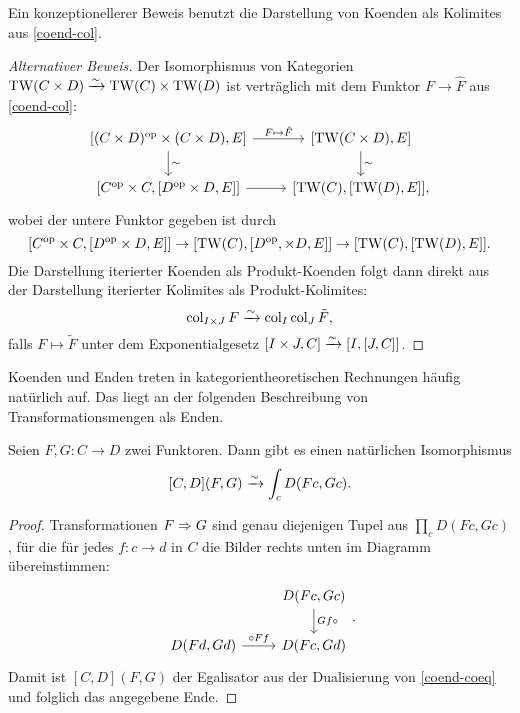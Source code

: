  Ein konzeptionellerer Beweis benutzt die Darstellung von Koenden als
 Kolimites aus \ref{coend-col}.
\begin{proof}[Alternativer Beweis]
  Der Isomorphismus von Kategorien $\operatorname{TW}(C \times D) \xrightarrow[]{\sim} \operatorname{TW}(C) \times
  \operatorname{TW}(D)$ ist verträglich mit dem Funktor $F \to \hat{F}$ aus
  \ref{coend-col}:
  \[ \begin{tikzcd}
    {[(C \times D)\op \times (C \times D), E]}
    \arrow{d}{\sim} \arrow{r}{F \mapsto \hat{F}}
    & {[\TW(C \times D), E]} \arrow{d}{\sim} \\
    {[C\op \times C, [D\op \times D, E]]} \arrow{r}
    & {[\TW(C), [\TW(D), E]]},
  \end{tikzcd}
  \]
  wobei der untere Funktor gegeben ist durch
  \[ [C^\mathrm{op} \times C, [D^\mathrm{op} \times D, E]]
  \to [\operatorname{TW}(C), [D^\mathrm{op}, \times D, E]] \to [\operatorname{TW}(C), [\operatorname{TW}(D), E]].
  \]
  Die Darstellung iterierter Koenden als Produkt-Koenden folgt dann
  direkt aus der Darstellung iterierter Kolimites als
  Produkt-Kolimites:
  \[ \operatorname{col}_{I \times J} F \xrightarrow[]{\sim} \operatorname{col}_I \operatorname{col}_J \tilde{F}, \]
  falls $F \mapsto \tilde{F}$ unter dem Exponentialgesetz $[I \times
    J, C] \xrightarrow[]{\sim} {[I, [J, C]]}$.
\end{proof}

Koenden und Enden treten in kategorientheoretischen Rechnungen häufig
natürlich auf. Das liegt an der folgenden Beschreibung von
Transformationsmengen als Enden.
\begin{lemma}
  \label{trans-end}
  Seien $F, G: C \to D$ zwei Funktoren. Dann gibt es einen natürlichen
  Isomorphismus
  \[ [C, D](F, G) \xrightarrow[]{\sim} \int_c D(Fc, Gc). \]
\end{lemma}
\begin{proof}
  Transformationen $F \Rightarrow G$ sind genau diejenigen Tupel aus
  $\prod_c D(Fc, Gc)$, für die für jedes $f: c \to d$ in $C$ die
  Bilder rechts unten im Diagramm übereinstimmen:
  \[ \begin{tikzcd}
    & D(Fc, Gc) \arrow{d}{Gf \circ} \\
    D(Fd, Gd) \arrow{r}{\circ Ff} & D(Fc, Gd)
  \end{tikzcd}. \]
  Damit ist $[C, D](F, G)$ der Egalisator aus der Dualisierung von
  \ref{coend-coeq} und folglich das angegebene Ende.
\end{proof}

